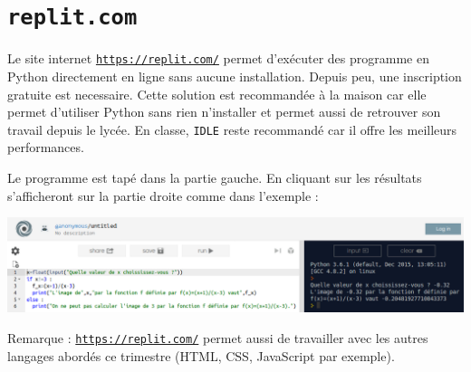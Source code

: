 \documentclass[12pt,oneside,french]{article}
\begin{document}
\section{\texttt{replit.com}}

Le site internet \texttt{\url{https://replit.com/}} permet d'exécuter des programme en Python directement en ligne sans aucune installation. Depuis peu, une inscription gratuite est necessaire. Cette solution est recommandée à la maison car elle permet d'utiliser Python sans rien n'installer et permet aussi de retrouver son travail depuis le lycée. En classe, \texttt{IDLE} reste recommandé car il offre les meilleurs performances.

Le programme est tapé dans la partie gauche. En cliquant sur  les résultats s'afficheront sur la partie droite comme dans l'exemple :\medskip

\includegraphics[width=\linewidth]{replit.png}

Remarque : \texttt{\url{https://replit.com/}} permet aussi de travailler avec les autres langages abordés ce trimestre (HTML, CSS, JavaScript par exemple).
\end{document}
